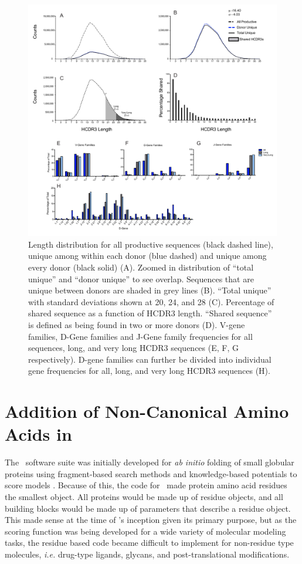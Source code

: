 \begin{figure}[!t]
   \centering
   \includegraphics[width=\linewidth]{images/chapter3/figure3_7.pdf} %
   \caption[Distribution and VDJ Gene Usage]{Length distribution for all productive sequences (black dashed line), unique among within each donor (blue dashed) and unique among every donor (black solid) (A). Zoomed in distribution of ``total unique'' and ``donor unique'' to see overlap. Sequences that are unique between donors are shaded in grey lines (B). ``Total unique'' with standard deviations shown at 20, 24, and 28 (C). Percentage of shared sequence as a function of HCDR3 length. ``Shared sequence'' is defined as being found in two or more donors (D). V-gene families, D-Gene families and J-Gene family frequencies for all sequences, long, and very long HCDR3 sequences (E, F, G respectively). D-gene families can further be divided into individual gene frequencies for all, long, and very long HCDR3 sequences (H).}
   \label{fig:figure3_7}
\end{figure}



\section{Addition of Non-Canonical Amino Acids in \rosetta}
The \rosetta~software suite was initially developed for \textit{ab initio} folding of small globular proteins using fragment-based search methods and knowledge-based potentials to score models \citep{Simons:1997do}. Because of this, the code for \rosetta~made protein amino acid residues the smallest object. All proteins would be made up of residue objects, and all building blocks would be made up of parameters that describe a residue object. This made sense at the time of \rosetta's inception given its primary purpose, but as the scoring function was being developed for a wide variety of molecular modeling tasks, the residue based code became difficult to implement for non-residue type molecules, \textit{i.e.} drug-type ligands, glycans, and post-translational modifications.

